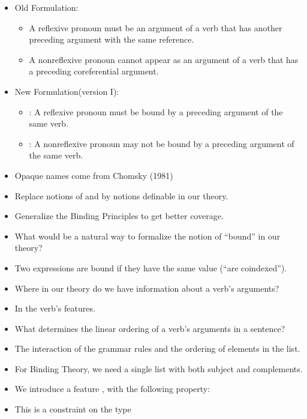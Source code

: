 \documentclass[a4paper,landscape,headrule,footrule]{foils}
\begin{document}
\begin{itemize}
\item Old Formulation:
\begin{itemize}
\item A reflexive pronoun must be an argument of a verb that
has another preceding argument with the same reference.
\item A nonreflexive pronoun cannot appear as an argument of
a verb that has a preceding coreferential argument.
\end{itemize}
\item New Formulation(version I):
\begin{itemize}
\item {}: A reflexive pronoun must be
bound by a preceding argument of the same verb.
\item {}: A nonreflexive pronoun may not
be bound by a preceding argument of the same verb.
\end{itemize}
\item Opaque names come from Chomsky (1981)
\end{itemize}

\begin{itemize}
\item Replace notions of  and  by notions
definable in our theory.
\item Generalize the Binding Principles to get
better coverage.
\end{itemize}


\begin{itemize}
\item[Q]  What would be a natural way to formalize
the notion of “bound” in our theory?
\item[A] Two expressions are bound if
they have the same  value (“are
coindexed”).
\item[Q] Where in our theory do we have information
about a verb’s arguments?
\item[A] In the verb’s  features.
\item[Q] What determines the linear ordering of a
verb’s arguments in a sentence?
\item[A] The interaction of the grammar
rules and the ordering of elements in the
 list.
\end{itemize}

\begin{itemize}
\item For Binding Theory, we need a single list with both subject
and complements.
\item We introduce a feature , with the following
property: \\

\item This is a constraint on the type 
\end{itemize}
\end{document}
